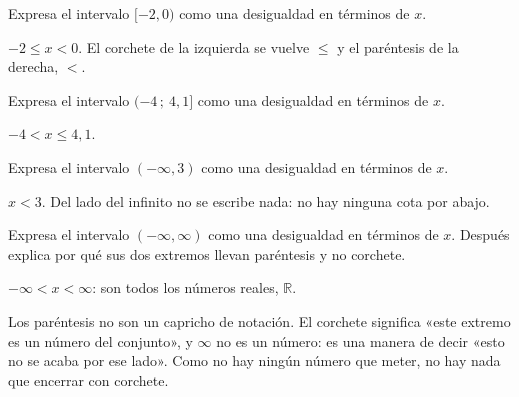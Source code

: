 \documentclass[11pt]{article}
\begin{document}
\begin{preguntas}
\pregunta[0.5] Expresa el intervalo $[-2, 0)$ como una desigualdad en términos de $x$.
\espacio{1.5cm}
\begin{solucion}
$-2 \le x < 0$. El corchete de la izquierda se vuelve $\le$ y el paréntesis de la derecha, $<$.
\end{solucion}

\pregunta[0.5] Expresa el intervalo $(-4\,;\ 4{,}1]$ como una desigualdad en términos de $x$.
\espacio{1.5cm}
\begin{solucion}
$-4 < x \le 4{,}1$.
\end{solucion}

\pregunta[0.5] Expresa el intervalo $(-\infty, 3)$ como una desigualdad en términos de $x$.
\espacio{1.5cm}
\begin{solucion}
$x < 3$. Del lado del infinito no se escribe nada: no hay ninguna cota por abajo.
\end{solucion}

\pregunta[1] Expresa el intervalo $(-\infty, \infty)$ como una desigualdad en términos de $x$.
Después explica por qué sus dos extremos llevan paréntesis y no corchete.
\espacio{3cm}
\begin{solucion}
$-\infty < x < \infty$: son todos los números reales, $\mathbb{R}$.

Los paréntesis no son un capricho de notación. El corchete significa «este extremo es un
número del conjunto», y $\infty$ no es un número: es una manera de decir «esto no se acaba por
ese lado». Como no hay ningún número que meter, no hay nada que encerrar con corchete.
\end{solucion}

\end{preguntas}
\end{document}
